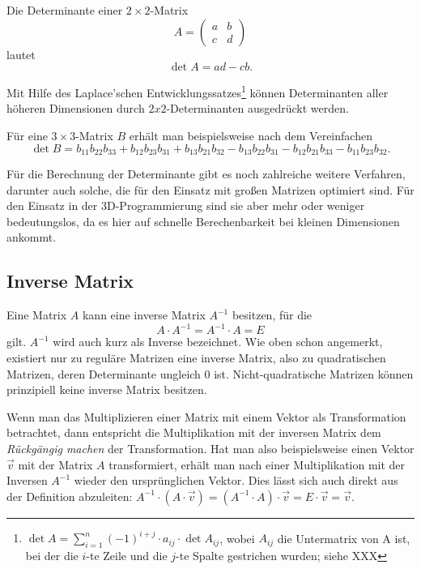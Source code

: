 Die Determinante einer $2 \times 2$-Matrix
\begin{equation*}
 A = \begin{pmatrix}
      a & b \\
      c & d
     \end{pmatrix}
\end{equation*}
lautet
\begin{equation}
 \det A = ad - cb.
\end{equation}

Mit Hilfe des Laplace'schen Entwicklungssatzes\footnote{$\det A = \sum_{i=1}^n (-1)^{i+j} \cdot a_{ij} \cdot \det A_{ij}$, wobei $A_{ij}$ die Untermatrix von A ist, bei der die $i$-te Zeile und die $j$-te Spalte gestrichen wurden; siehe XXX} können Determinanten aller höheren Dimensionen durch $2x2$-Determinanten ausgedrückt werden.

Für eine $3 \times 3$-Matrix $B$ erhält man beispielsweise nach dem Vereinfachen
\begin{equation}
 \det B = b_{11} b_{22} b_{33} + b_{12} b_{23} b_{31} + b_{13} b_{21} b_{32} - b_{13} b_{22} b_{31} - b_{12} b_{21} b_{33} - b_{11} b_{23} b_{32}.
\end{equation}

Für die Berechnung der Determinante gibt es noch zahlreiche weitere Verfahren, darunter auch solche, die für den Einsatz mit großen Matrizen optimiert sind. Für den Einsatz in der 3D-Programmierung sind sie aber mehr oder weniger bedeutungslos, da es hier auf schnelle Berechenbarkeit bei kleinen Dimensionen ankommt.


\subsection{Inverse Matrix}
\label{inversion}
Eine Matrix $A$ kann eine inverse Matrix $A^{-1}$ besitzen, für die
\begin{equation}
 A \cdot A^{-1} = A^{-1} \cdot A = E
\end{equation}
gilt. $A^{-1}$ wird auch kurz als Inverse bezeichnet. Wie oben schon angemerkt, existiert nur zu reguläre Matrizen eine inverse Matrix, also zu quadratischen Matrizen, deren Determinante ungleich 0 ist. Nicht-quadratische Matrizen können prinzipiell keine inverse Matrix besitzen.

Wenn man das Multiplizieren einer Matrix mit einem Vektor als Transformation betrachtet, dann entspricht die Multiplikation mit der inversen Matrix dem \emph{Rückgängig machen} der Transformation. Hat man also beispielsweise einen Vektor $\vec v$ mit der Matrix $A$ transformiert, erhält man nach einer Multiplikation mit der Inversen $A^{-1}$ wieder den ursprünglichen Vektor. Dies lässt sich auch direkt aus der Definition abzuleiten: $A^{-1} \cdot ( A \cdot \vec v ) = (A^{-1} \cdot A) \cdot \vec v = E \cdot \vec v = \vec v$.

